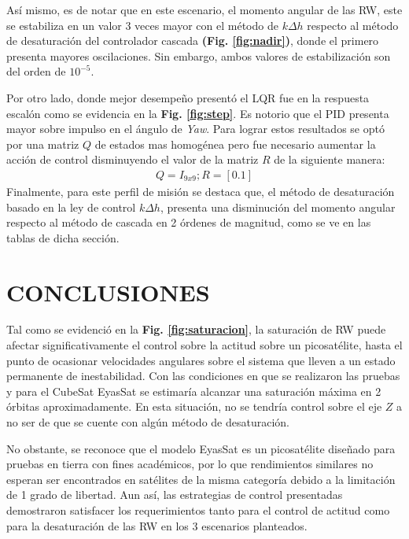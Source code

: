 Así mismo, es de notar que en este escenario, el momento angular de las RW, este se estabiliza en un valor 3 veces mayor con el método de $k\Delta h$ respecto al método de desaturación del controlador cascada \textbf{(Fig. \ref{fig:nadir})}, donde el primero presenta mayores oscilaciones. Sin embargo, ambos valores de estabilización son del orden de $10^{-5}$. 

Por otro lado, donde mejor desempeño presentó el LQR fue en la respuesta escalón como se evidencia en la \textbf{Fig. \ref{fig:step}}. Es notorio que el PID presenta mayor sobre impulso en el ángulo de \textit{Yaw}. Para lograr estos resultados se optó por una matriz $Q$ de estados mas homogénea pero fue necesario aumentar la acción de control disminuyendo el valor de la matriz $R$ de la siguiente manera:  
\begin{equation}
	\begin{gathered}
		Q = I_{9x9};		
		R=[0.1]
	\end{gathered}	
\end{equation}
Finalmente, para este perfil de misión se destaca que, el método de desaturación basado en la ley de control $k\Delta h$, presenta una disminución del momento angular respecto al método de cascada en 2 órdenes de magnitud, como se ve en las tablas de dicha sección.

\section{CONCLUSIONES}


Tal como se evidenció en la \textbf{Fig. \ref{fig:saturacion}}, la saturación de RW puede afectar significativamente el control sobre la actitud sobre un picosatélite, hasta el punto de ocasionar velocidades angulares sobre el sistema que lleven a un estado permanente de inestabilidad. Con las condiciones en que se realizaron las pruebas y para el CubeSat EyasSat se estimaría alcanzar una saturación máxima en 2 órbitas aproximadamente. En esta situación, no se tendría control sobre el eje $Z$ a no ser de que se cuente con algún método de desaturación.

No obstante, se reconoce que el modelo EyasSat es un picosatélite diseñado para pruebas en tierra con fines académicos, por lo que rendimientos similares no esperan ser encontrados en satélites de la misma categoría debido a la limitación de 1 grado de libertad. Aun así, las estrategias de control presentadas demostraron satisfacer los requerimientos tanto para el control de actitud como para la desaturación de las RW en los 3 escenarios planteados.

